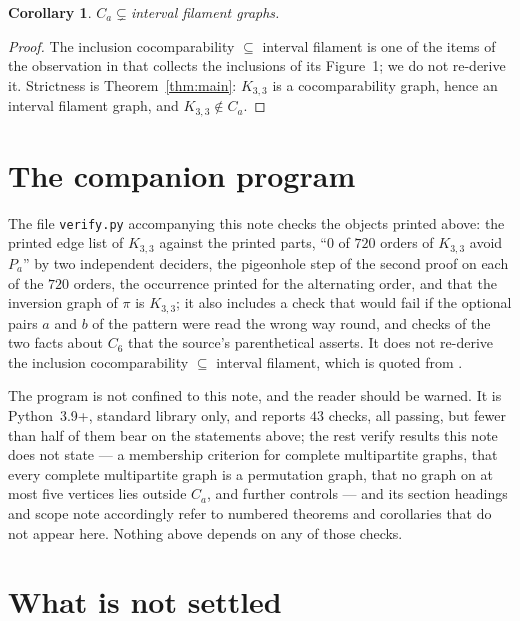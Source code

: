 \documentclass[11pt]{amsart}
\newtheorem{corollary}[theorem]{Corollary}
\theoremstyle{remark}
\newcommand{\Ca}{C_a}
\newcommand{\Pa}{P_a}
\begin{document}
\begin{corollary}\label{cor:filament}
$\Ca\subsetneq{}$interval filament graphs.
\end{corollary}

\begin{proof}
The inclusion cocomparability ${}\subseteq{}$ interval filament is one of the
items of the observation in \cite{FH} that collects the inclusions of its
Figure~1; we do not re-derive it. Strictness is
Theorem~\ref{thm:main}: $K_{3,3}$ is a cocomparability graph, hence an interval
filament graph, and $K_{3,3}\notin\Ca$.
\end{proof}

\section{The companion program}\label{sec:verify}

The file \texttt{verify.py} accompanying this note checks the objects printed above:
the printed edge list of $K_{3,3}$ against the printed parts, ``$0$ of $720$ orders
of $K_{3,3}$ avoid $\Pa$'' by two independent deciders, the pigeonhole step of the
second proof on each of the $720$ orders, the occurrence printed for the alternating
order, and that the inversion graph of $\pi$ is $K_{3,3}$; it also includes a check
that would fail if the optional pairs $a$ and $b$ of the pattern were read the wrong
way round, and checks of the two facts about $C_6$ that the source's parenthetical
asserts. It does not re-derive the inclusion cocomparability ${}\subseteq{}$
interval filament, which is quoted from \cite{FH}.

The program is not confined to this note, and the reader should be warned. It is
Python~3.9+, standard library only, and reports $43$ checks, all passing, but fewer
than half of them bear on the statements above; the rest verify results this note
does not state --- a membership criterion for complete multipartite graphs, that
every complete multipartite graph is a permutation graph, that no graph on at most
five vertices lies outside $\Ca$, and further controls --- and its section headings
and scope note accordingly refer to numbered theorems and corollaries that do not
appear here. Nothing above depends on any of those checks.

\section{What is not settled}
\end{document}
